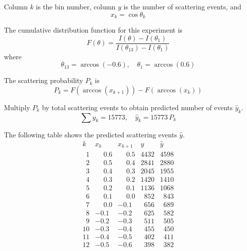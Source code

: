 Column $k$ is the bin number, column $y$ is the number of scattering events, and
\begin{equation*}
x_k=\cos\theta_k
\end{equation*}

The cumulative distribution function for this experiment is
\begin{equation*}
F(\theta)=\frac{I(\theta)-I(\theta_1)}
{I(\theta_{13})-I(\theta_1)}
\end{equation*}
where
\begin{equation*}
\theta_{13}=\arccos(-0.6),
\quad
\theta_1=\arccos(0.6)
\end{equation*}

The scattering probability $P_k$ is
\begin{equation*}
P_k=F\left(\arccos(x_{k+1})\right)-F\left(\arccos(x_k)\right)
\end{equation*}

Multiply $P_k$ by total scattering events to obtain predicted number of events $\hat y_k$.
\begin{equation*}
\sum y_k=15773,\quad \hat y_k=15773\,P_k
\end{equation*}

The following table shows the predicted scattering events $\hat y$.
\begin{equation*}
\begin{matrix}
k & x_k & x_{k+1} & y & \hat y\\
\phantom01 & \phantom+0.6 & \phantom+0.5 & 4432 & 4598\\
\phantom02 & \phantom+0.5 & \phantom+0.4 & 2841 & 2880\\
\phantom03 & \phantom+0.4 & \phantom+0.3 & 2045 & 1955\\
\phantom04 & \phantom+0.3 & \phantom+0.2 & 1420 & 1410\\
\phantom05 & \phantom+0.2 & \phantom+0.1 & 1136 & 1068\\
\phantom06 & \phantom+0.1 & \phantom+0.0 & \phantom0852 & \phantom0843\\
\phantom07 & \phantom+0.0 & -0.1 & \phantom0656 & \phantom0689\\
\phantom08 & -0.1 & -0.2 & \phantom0625 & \phantom0582\\
\phantom09 & -0.2 & -0.3 & \phantom0511 & \phantom0505\\
10 & -0.3 & -0.4 & \phantom0455 & \phantom0450\\
11 & -0.4 & -0.5 & \phantom0402 & \phantom0411\\
12 & -0.5 & -0.6 & \phantom0398 & \phantom0382
\end{matrix}
\end{equation*}

